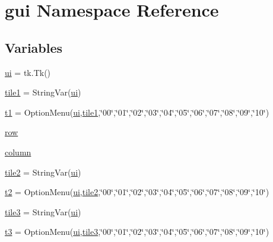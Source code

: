 \hypertarget{namespacegui}{}\section{gui Namespace Reference}
\label{namespacegui}
\subsection*{Variables}
\begin{DoxyCompactItemize}
\item 
\mbox{\hyperlink{namespacegui_a40ab7281456eadbea2dc2038f5c24fa1}{ui}} = tk.\+Tk()
\item 
\mbox{\hyperlink{namespacegui_a50ef8346e02b4fb74cc1f3c01cc5327a}{tile1}} = String\+Var(\mbox{\hyperlink{namespacegui_a40ab7281456eadbea2dc2038f5c24fa1}{ui}})
\item 
\mbox{\hyperlink{namespacegui_a4f22ad928dc308fc066844b0a34b8ae7}{t1}} = Option\+Menu(\mbox{\hyperlink{namespacegui_a40ab7281456eadbea2dc2038f5c24fa1}{ui}},\mbox{\hyperlink{namespacegui_a50ef8346e02b4fb74cc1f3c01cc5327a}{tile1}},\char`\"{}00\char`\"{},\char`\"{}01\char`\"{},\char`\"{}02\char`\"{},\char`\"{}03\char`\"{},\char`\"{}04\char`\"{},\char`\"{}05\char`\"{},\char`\"{}06\char`\"{},\char`\"{}07\char`\"{},\char`\"{}08\char`\"{},\char`\"{}09\char`\"{},\char`\"{}10\char`\"{})
\item 
\mbox{\hyperlink{namespacegui_a783954bf6031f175ef0ddae4ac1dd3dc}{row}}
\item 
\mbox{\hyperlink{namespacegui_a779aeda230f988f7df07814a8e4084b8}{column}}
\item 
\mbox{\hyperlink{namespacegui_a53f57a204bf56c498146081b29ab8750}{tile2}} = String\+Var(\mbox{\hyperlink{namespacegui_a40ab7281456eadbea2dc2038f5c24fa1}{ui}})
\item 
\mbox{\hyperlink{namespacegui_a97744d56325244bb6b67797f5929f2f4}{t2}} = Option\+Menu(\mbox{\hyperlink{namespacegui_a40ab7281456eadbea2dc2038f5c24fa1}{ui}},\mbox{\hyperlink{namespacegui_a53f57a204bf56c498146081b29ab8750}{tile2}},\char`\"{}00\char`\"{},\char`\"{}01\char`\"{},\char`\"{}02\char`\"{},\char`\"{}03\char`\"{},\char`\"{}04\char`\"{},\char`\"{}05\char`\"{},\char`\"{}06\char`\"{},\char`\"{}07\char`\"{},\char`\"{}08\char`\"{},\char`\"{}09\char`\"{},\char`\"{}10\char`\"{})
\item 
\mbox{\hyperlink{namespacegui_a1a6bb0561f02127f121022bf818450b2}{tile3}} = String\+Var(\mbox{\hyperlink{namespacegui_a40ab7281456eadbea2dc2038f5c24fa1}{ui}})
\item 
\mbox{\hyperlink{namespacegui_a1098688efc4d42953e22acb4e81138ac}{t3}} = Option\+Menu(\mbox{\hyperlink{namespacegui_a40ab7281456eadbea2dc2038f5c24fa1}{ui}},\mbox{\hyperlink{namespacegui_a1a6bb0561f02127f121022bf818450b2}{tile3}},\char`\"{}00\char`\"{},\char`\"{}01\char`\"{},\char`\"{}02\char`\"{},\char`\"{}03\char`\"{},\char`\"{}04\char`\"{},\char`\"{}05\char`\"{},\char`\"{}06\char`\"{},\char`\"{}07\char`\"{},\char`\"{}08\char`\"{},\char`\"{}09\char`\"{},\char`\"{}10\char`\"{})

\end{DoxyCompactItemize}
